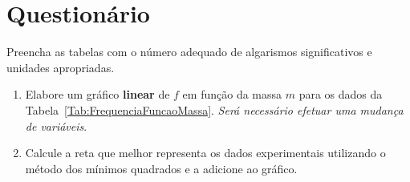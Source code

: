 \begin{fullwidth}
\noindent{}
\vspace{5mm}

\noindent{}

\noindent{}

\noindent{}

\noindent{}

\noindent{}
\end{fullwidth}

\vspace{5mm}

\section{Questionário}

\begin{question}[type={exam}]
Preencha as tabelas com o número adequado de algarismos significativos e unidades apropriadas. 
\end{question}

\begin{question}[type={exam}]\label{Q:Ondas:GraficoFM}
\begin{enumerate}[label=\roman*.]
\item Elabore um gráfico \textbf{linear} de $f$ em função da massa $m$ para os dados da Tabela~\ref{Tab:FrequenciaFuncaoMassa}. \emph{Será necessário efetuar uma mudança de variáveis}.
\item Calcule a reta que melhor representa os dados experimentais utilizando o método dos mínimos quadrados e a adicione ao gráfico.
\end{enumerate}
\end{question}

